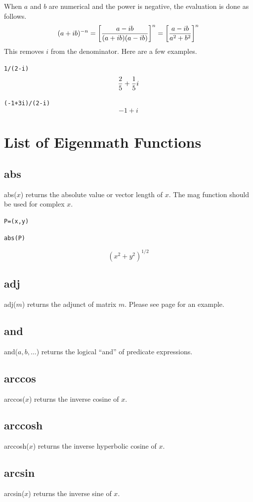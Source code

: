 \documentclass[12pt]{book}
\begin{document}
\medskip
\noindent
When $a$ and $b$ are numerical and the power is negative, the evaluation is done as follows.
$$(a+ib)^{-n}=\left[{a-ib\over(a+ib)(a-ib)}\right]^n=\left[{a-ib\over a^2+b^2}\right]^n$$
This removes $i$ from the denominator.
Here are a few examples.

\medskip
\verb$1/(2-i)$
$${2\over5}+{1\over5}i$$

\verb$(-1+3i)/(2-i)$
$$-1+i$$

\newpage

\chapter{List of Eigenmath Functions}

\section*{abs}
abs($x$) returns the absolute value or vector length of $x$.
The mag function should be used for complex $x$.

\medskip
{\tt P=(x,y)}

{\tt abs(P)}

$$(x^2+y^2)^{1/2}$$

\section*{adj}
adj($m$) returns the adjunct of matrix $m$.
Please see page \pageref{adj} for an example.

\section*{and}
and($a,b,\ldots$) returns the logical ``and'' of predicate expressions.

\section*{arccos}
arccos($x$) returns the inverse cosine of $x$.

\section*{arccosh}
arccosh($x$) returns the inverse hyperbolic cosine of $x$.

\section*{arcsin}
arcsin($x$) returns the inverse sine of $x$.
\end{document}
